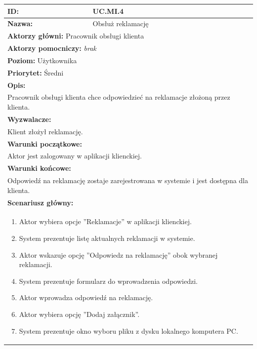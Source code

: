 \begin{center}
\begin{longtable}[h]{|p{1.6cm}|p{13.5cm}|}
\hline
\textbf{ID:} & UC.MI.4 \\ \hline
\textbf{Nazwa:} & Obsłuż reklamację \\ \hline
\multicolumn{2}{|p{15.1cm}|}{\textbf{Aktorzy główni:} Pracownik obsługi klienta} \\
\multicolumn{2}{|p{15.1cm}|}{\textbf{Aktorzy pomocniczy:} 
\textit{brak}} \\
\multicolumn{2}{|p{15.1cm}|}{\textbf{Poziom:} Użytkownika} \\
\multicolumn{2}{|p{15.1cm}|}{\textbf{Priorytet:} Średni} \\
\hline
\multicolumn{2}{|p{15.1cm}|}{\textbf{Opis:}} \\
\multicolumn{2}{|p{15.1cm}|}{
Pracownik obsługi klienta chce odpowiedzieć na reklamacje złożoną przez klienta.
} \\ \hline
\multicolumn{2}{|p{15.1cm}|}{\textbf{Wyzwalacze:}} \\
\multicolumn{2}{|p{15.1cm}|}{
Klient złożył reklamację.
} \\ \hline
\multicolumn{2}{|p{15.1cm}|}{\textbf{Warunki początkowe:}} \\
\multicolumn{2}{|p{15.1cm}|}{
Aktor jest zalogowany w aplikacji klienckiej.
} \\ \hline
\multicolumn{2}{|p{15.1cm}|}{\textbf{Warunki końcowe:}} \\
\multicolumn{2}{|p{15.1cm}|}{
Odpowiedź na reklamację zostaje zarejestrowana w systemie i jest dostępna dla klienta.
} \\ \hline
\multicolumn{2}{|p{15.1cm}|}{\textbf{Scenariusz główny:}} \\
\multicolumn{2}{|p{15.1cm}|}{
\begin{enumerate}
\item Aktor wybiera opcje ''Reklamacje'' w aplikacji klienckiej.
\item System prezentuje listę aktualnych reklamacji w systemie.
\item Aktor wskazuje opcję ''Odpowiedz na reklamację'' obok wybranej reklamacji.
\item System prezentuje formularz do wprowadzenia odpowiedzi.
\item Aktor wprowadza odpowiedź na reklamację.
\item Aktor wybiera opcję ''Dodaj załącznik''.
\item System prezentuje okno wyboru pliku z dysku lokalnego komputera PC.

\end{enumerate}}
\end{longtable}
\end{center}
